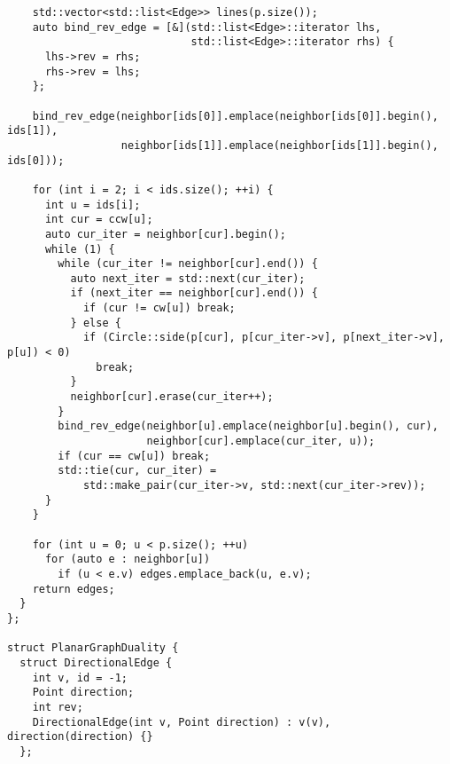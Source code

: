 \documentclass[6pt]{article}
\begin{document}
\begin{multicols}{2}
\begin{lstlisting}
    std::vector<std::list<Edge>> lines(p.size());
    auto bind_rev_edge = [&](std::list<Edge>::iterator lhs,
                             std::list<Edge>::iterator rhs) {
      lhs->rev = rhs;
      rhs->rev = lhs;
    };

    bind_rev_edge(neighbor[ids[0]].emplace(neighbor[ids[0]].begin(), ids[1]),
                  neighbor[ids[1]].emplace(neighbor[ids[1]].begin(), ids[0]));

    for (int i = 2; i < ids.size(); ++i) {
      int u = ids[i];
      int cur = ccw[u];
      auto cur_iter = neighbor[cur].begin();
      while (1) {
        while (cur_iter != neighbor[cur].end()) {
          auto next_iter = std::next(cur_iter);
          if (next_iter == neighbor[cur].end()) {
            if (cur != cw[u]) break;
          } else {
            if (Circle::side(p[cur], p[cur_iter->v], p[next_iter->v], p[u]) < 0)
              break;
          }
          neighbor[cur].erase(cur_iter++);
        }
        bind_rev_edge(neighbor[u].emplace(neighbor[u].begin(), cur),
                      neighbor[cur].emplace(cur_iter, u));
        if (cur == cw[u]) break;
        std::tie(cur, cur_iter) =
            std::make_pair(cur_iter->v, std::next(cur_iter->rev));
      }
    }

    for (int u = 0; u < p.size(); ++u)
      for (auto e : neighbor[u])
        if (u < e.v) edges.emplace_back(u, e.v);
    return edges;
  }
};

struct PlanarGraphDuality {
  struct DirectionalEdge {
    int v, id = -1;
    Point direction;
    int rev;
    DirectionalEdge(int v, Point direction) : v(v), direction(direction) {}
  };


\end{lstlisting}
\end{multicols}
\end{document}
